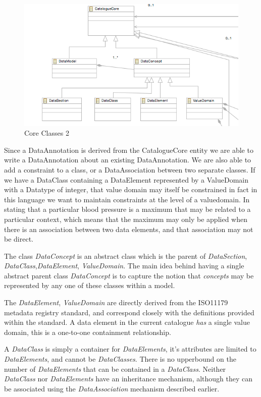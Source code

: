 \documentclass{article}
\begin{document}
\begin{figure}[here]
\includegraphics[scale=0.4]{images/core2}
\caption{Core Classes 2} 
\label{fig:core2}
\end{figure}


Since a DataAnnotation is derived from the CatalogueCore entity we are able to write a DataAnnotation about an existing DataAnnotation. We are also able to add a constraint to a class, or a DataAssociation between two separate classes. If we have a DataClass containing a DataElement represented by a ValueDomain with a Datatype of integer, that value domain may itself be constrained in fact in this language we want to maintain constraints at the level of a valuedomain. In stating that a particular blood pressure is a maximum that may be related to a particular context, which means that the maximum may only be applied when there is an association between two data elements, and that association may not be direct.




The class \emph{DataConcept} is an abstract class which is the parent of \emph{DataSection}, \emph{DataClass},\emph{DataElement}, \emph{ValueDomain}. The main idea behind having a single abstract parent class  \emph{DataConcept}  is to capture the notion that \emph{concepts} may be represented by any one of these classes within a model.  

The \emph{DataElement}, \emph{ValueDomain} are directly derived from the ISO11179 metadata registry standard, and correspond closely with the definitions provided within the standard. A data element in the current catalogue \emph{has} a single value domain, this is a one-to-one containment relationship. 

A \emph{DataClass} is simply a container for \emph{DataElements}, it's attributes are limited to \emph{DataElements}, and cannot be  \emph{DataClasses}. There is no upperbound on the number of \emph{DataElements} that can be contained in a \emph{DataClass}. Neither \emph{DataClass} nor \emph{DataElements} have an inheritance mechanism, although they can be associated using the \emph{DataAssociation} mechanism described earlier.
\end{document}
